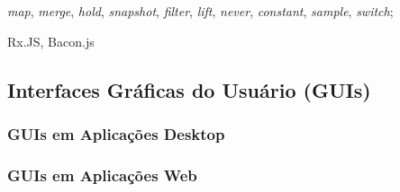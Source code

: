 

{\tiny\begin{description}[noitemsep]
  \item [As 10 Primitivas Básicas] \emph{map}, \emph{merge}, \emph{hold},
    \emph{snapshot}, \emph{filter}, \emph{lift}, \emph{never}, \emph{constant},
    \emph{sample}, \emph{switch};
  \item [Combinação de Primitivas]
  \item [Arcabouços \emph{(Frameworks)}] Rx.JS, Bacon.js
\end{description}}



\subsection{Interfaces Gráficas do Usuário (GUIs)}
\label{sec:guis}

\subsubsection{GUIs em Aplicações Desktop}
\label{sec:guis-desktop}


\subsubsection{GUIs em Aplicações Web}
\label{sec:guis-web}

%
%


